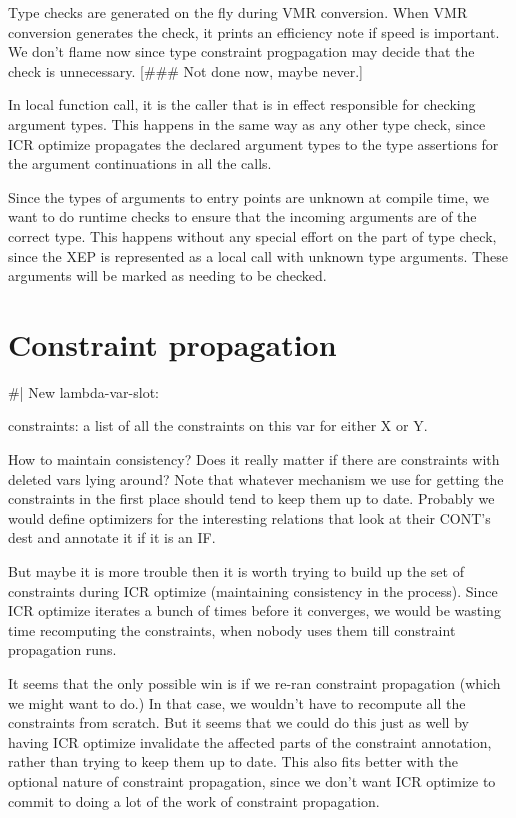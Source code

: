 Type checks are generated on the fly during VMR conversion.  When VMR
conversion generates the check, it prints an efficiency note if speed is
important.  We don't flame now since type constraint progpagation may decide
that the check is unnecessary.  [\#\#\# Not done now, maybe never.]

In local function call, it is the caller that is in effect responsible for
checking argument types.  This happens in the same way as any other type check,
since ICR optimize propagates the declared argument types to the type
assertions for the argument continuations in all the calls.

Since the types of arguments to entry points are unknown at compile time, we
want to do runtime checks to ensure that the incoming arguments are of the
correct type.  This happens without any special effort on the part of type
check, since the XEP is represented as a local call with unknown type
arguments.  These arguments will be marked as needing to be checked.


\chapter{Constraint propagation}

\#|
New lambda-var-slot:

constraints: a list of all the constraints on this var for either X or Y.

How to maintain consistency?  Does it really matter if there are constraints
with deleted vars lying around?  Note that whatever mechanism we use for
getting the constraints in the first place should tend to keep them up to date.
Probably we would define optimizers for the interesting relations that look at
their CONT's dest and annotate it if it is an IF.

But maybe it is more trouble then it is worth trying to build up the set of
constraints during ICR optimize (maintaining consistency in the process).
Since ICR optimize iterates a bunch of times before it converges, we would be
wasting time recomputing the constraints, when nobody uses them till constraint
propagation runs.  

It seems that the only possible win is if we re-ran constraint propagation
(which we might want to do.)  In that case, we wouldn't have to recompute all
the constraints from scratch.  But it seems that we could do this just as well
by having ICR optimize invalidate the affected parts of the constraint
annotation, rather than trying to keep them up to date.  This also fits better
with the optional nature of constraint propagation, since we don't want ICR
optimize to commit to doing a lot of the work of constraint propagation.  

